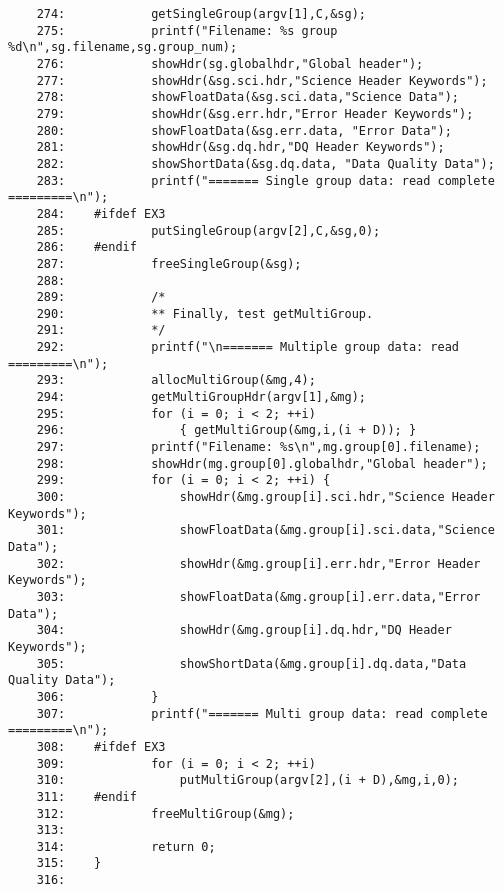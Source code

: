 \begin{scriptsize}
\begin{verbatim}
    274:            getSingleGroup(argv[1],C,&sg);
    275:            printf("Filename: %s group %d\n",sg.filename,sg.group_num);
    276:            showHdr(sg.globalhdr,"Global header");
    277:            showHdr(&sg.sci.hdr,"Science Header Keywords");
    278:            showFloatData(&sg.sci.data,"Science Data");
    279:            showHdr(&sg.err.hdr,"Error Header Keywords");
    280:            showFloatData(&sg.err.data, "Error Data");
    281:            showHdr(&sg.dq.hdr,"DQ Header Keywords");
    282:            showShortData(&sg.dq.data, "Data Quality Data");
    283:            printf("======= Single group data: read complete =========\n");
    284:    #ifdef EX3
    285:            putSingleGroup(argv[2],C,&sg,0);
    286:    #endif
    287:            freeSingleGroup(&sg);
    288:    
    289:            /*
    290:            ** Finally, test getMultiGroup.
    291:            */
    292:            printf("\n======= Multiple group data: read =========\n");
    293:            allocMultiGroup(&mg,4);
    294:            getMultiGroupHdr(argv[1],&mg);
    295:            for (i = 0; i < 2; ++i)
    296:                { getMultiGroup(&mg,i,(i + D)); }
    297:            printf("Filename: %s\n",mg.group[0].filename);
    298:            showHdr(mg.group[0].globalhdr,"Global header");
    299:            for (i = 0; i < 2; ++i) {
    300:                showHdr(&mg.group[i].sci.hdr,"Science Header Keywords");
    301:                showFloatData(&mg.group[i].sci.data,"Science Data");
    302:                showHdr(&mg.group[i].err.hdr,"Error Header Keywords");
    303:                showFloatData(&mg.group[i].err.data,"Error Data");
    304:                showHdr(&mg.group[i].dq.hdr,"DQ Header Keywords");
    305:                showShortData(&mg.group[i].dq.data,"Data Quality Data");
    306:            }
    307:            printf("======= Multi group data: read complete =========\n");
    308:    #ifdef EX3
    309:            for (i = 0; i < 2; ++i)
    310:                putMultiGroup(argv[2],(i + D),&mg,i,0);
    311:    #endif
    312:            freeMultiGroup(&mg);
    313:    
    314:            return 0;
    315:    }
    316:    
\end{verbatim}
\end{scriptsize}

